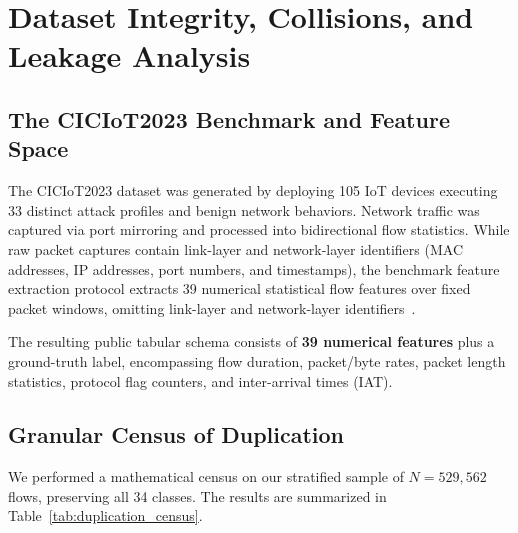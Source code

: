 \documentclass[conference,10pt,twocolumn]{IEEEtran}
\begin{document}
\section{Dataset Integrity, Collisions, and Leakage Analysis}
\label{sec:dataset_integrity}

\subsection{The CICIoT2023 Benchmark and Feature Space}
The CICIoT2023 dataset was generated by deploying 105 IoT devices executing 33 distinct attack profiles and benign network behaviors. Network traffic was captured via port mirroring and processed into bidirectional flow statistics. While raw packet captures contain link-layer and network-layer identifiers (MAC addresses, IP addresses, port numbers, and timestamps), the benchmark feature extraction protocol extracts 39 numerical statistical flow features over fixed packet windows, omitting link-layer and network-layer identifiers~\cite{neto2023ciciot}.

The resulting public tabular schema consists of \textbf{39 numerical features} plus a ground-truth label, encompassing flow duration, packet/byte rates, packet length statistics, protocol flag counters, and inter-arrival times (IAT).

\subsection{Granular Census of Duplication}
We performed a mathematical census on our stratified sample of $N = 529,562$ flows, preserving all 34 classes. The results are summarized in Table~\ref{tab:duplication_census}.
\end{document}
